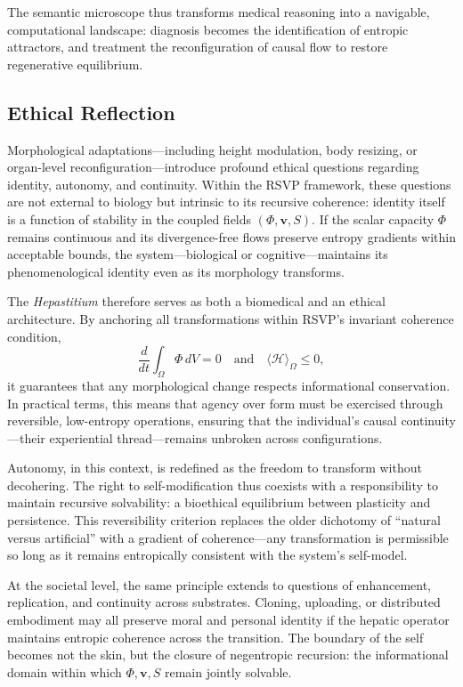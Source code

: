 \documentclass[12pt]{article}
\begin{document}
The semantic microscope thus transforms medical reasoning into a navigable, computational landscape:  
diagnosis becomes the identification of entropic attractors, and treatment the reconfiguration of causal flow
to restore regenerative equilibrium.

\subsection{Ethical Reflection}
\label{subsec:ethical_reflection}

Morphological adaptations---including height modulation, body resizing, or organ-level reconfiguration---introduce profound ethical questions regarding identity, autonomy, and continuity.  
Within the RSVP framework, these questions are not external to biology but intrinsic to its recursive coherence: identity itself is a function of stability in the coupled fields \((\Phi, \mathbf{v}, S)\).  
If the scalar capacity \(\Phi\) remains continuous and its divergence-free flows preserve entropy gradients within acceptable bounds, the system---biological or cognitive---maintains its phenomenological identity even as its morphology transforms.

The \emph{Hepastitium} therefore serves as both a biomedical and an ethical architecture.  
By anchoring all transformations within RSVP’s invariant coherence condition,
\[
\frac{d}{dt}\int_{\Omega} \Phi\, dV = 0 \quad \text{and} \quad 
\langle \mathcal{H} \rangle_\Omega \le 0,
\]
it guarantees that any morphological change respects informational conservation.  
In practical terms, this means that agency over form must be exercised through reversible, low-entropy operations, ensuring that the individual’s causal continuity---their experiential thread---remains unbroken across configurations.

Autonomy, in this context, is redefined as the freedom to transform without decohering.  
The right to self-modification thus coexists with a responsibility to maintain recursive solvability: a bioethical equilibrium between plasticity and persistence.  
This reversibility criterion replaces the older dichotomy of “natural versus artificial” with a gradient of coherence---any transformation is permissible so long as it remains entropically consistent with the system’s self-model.

At the societal level, the same principle extends to questions of enhancement, replication, and continuity across substrates.  
Cloning, uploading, or distributed embodiment may all preserve moral and personal identity if the hepatic operator maintains entropic coherence across the transition.  
The boundary of the self becomes not the skin, but the closure of negentropic recursion: the informational domain within which \(\Phi, \mathbf{v}, S\) remain jointly solvable.
\end{document}
